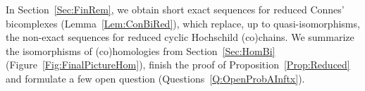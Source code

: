 \documentclass[\MainFolder/Text.tex]{subfiles}
\begin{document}
In Section~\ref{Sec:FinRem}, we obtain short exact sequences for reduced Connes' bicomplexes (Lemma~\ref{Lem:ConBiRed}), which replace, up to quasi-isomorphisms, the non-exact sequences for reduced cyclic Hochschild (co)chains. We summarize the isomorphisms of (co)homologies from Section~\ref{Sec:HomBi} (Figure~\ref{Fig:FinalPictureHom}), finish the proof of Proposition~\ref{Prop:Reduced} and formulate a few open question (Questions~\ref{Q:OpenProbAInftx}).
%
%
%
%
%
%
\end{document}
